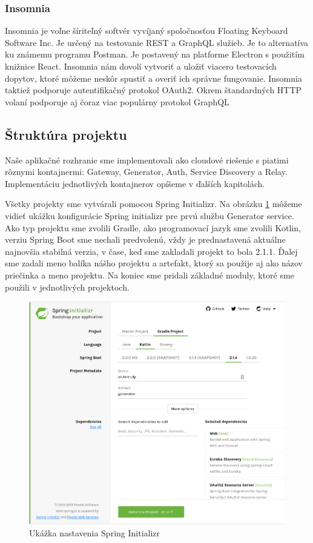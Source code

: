 \subsubsection{Insomnia}
Insomnia \cite{insomnia} je voľne šíriteľný softvér vyvíjaný spoločnosťou Floating Keyboard Software Inc. Je určený na testovanie REST a GraphQL služieb. Je to alternatíva ku známemu programu Postman. Je postavený na platforme Electron s použitím knižnice React. Insomnia nám dovolí vytvoriť a uložiť viacero testovacích dopytov, ktoré môžeme neskôr spustiť a overiť ich správne fungovanie. Insomnia taktiež podporuje autentifikačný protokol OAuth2. Okrem štandardných HTTP volaní podporuje aj čoraz viac populárny protokol GraphQL



\subsection{Štruktúra projektu}
Naše aplikačné rozhranie sme implementovali ako cloudové riešenie s piatimi rôznymi kontajnermi: Gateway, Generator, Auth, Service Discovery a Relay. Implementáciu jednotlivých kontajnerov opíšeme v ďalších kapitolách.

Všetky projekty sme vytvárali pomocou Spring Initializr. Na obrázku \ref{initializr} môžeme vidieť ukážku konfigurácie Spring initializr pre prvú službu Generator service.  Ako typ projektu sme zvolili Gradle, ako programovací jazyk sme zvolili Kotlin, verziu Spring Boot sme nechali predvolenú, vždy je prednastavená aktuálne najnovšia stabilná verzia, v čase, keď sme zakladali projekt to bola 2.1.1. Ďalej sme zadali meno balíka nášho projektu a artefakt, ktorý sa použije aj ako názov priečinka a meno projektu. Na koniec sme pridali základné moduly, ktoré sme použili v jednotlivých projektoch.

 \begin{figure}[!htbp]
	\centering
	\includegraphics[width=16cm]{img/initializr.png}
	\caption{Ukážka nastavenia Spring Initializr}
	\label{initializr}
\end{figure}

